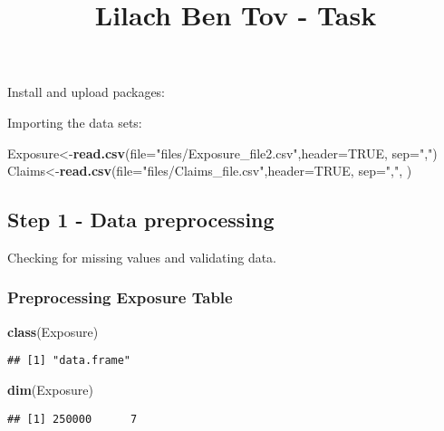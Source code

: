 \documentclass[]{article}
\title{Lilach Ben Tov - Task}
\author{}
\date{}
\newenvironment{Shaded}{\begin{snugshade}}{\end{snugshade}}
\newcommand{\KeywordTok}[1]{\textcolor[rgb]{0.13,0.29,0.53}{\textbf{#1}}}
\newcommand{\DataTypeTok}[1]{\textcolor[rgb]{0.13,0.29,0.53}{#1}}
\newcommand{\StringTok}[1]{\textcolor[rgb]{0.31,0.60,0.02}{#1}}
\newcommand{\OtherTok}[1]{\textcolor[rgb]{0.56,0.35,0.01}{#1}}
\newcommand{\NormalTok}[1]{#1}
\begin{document}
\maketitle

Install and upload packages:

Importing the data sets:

\begin{Shaded}
\begin{Highlighting}[]
\NormalTok{Exposure<-}\KeywordTok{read.csv}\NormalTok{(}\DataTypeTok{file=}\StringTok{"files/Exposure_file2.csv"}\NormalTok{,}\DataTypeTok{header=}\OtherTok{TRUE}\NormalTok{, }\DataTypeTok{sep=}\StringTok{","}\NormalTok{)}
\NormalTok{Claims<-}\KeywordTok{read.csv}\NormalTok{(}\DataTypeTok{file=}\StringTok{"files/Claims_file.csv"}\NormalTok{,}\DataTypeTok{header=}\OtherTok{TRUE}\NormalTok{, }\DataTypeTok{sep=}\StringTok{","}\NormalTok{, )}
\end{Highlighting}
\end{Shaded}

\subsection{Step 1 - Data
preprocessing}\label{step-1---data-preprocessing}

Checking for missing values and validating data.

\subsubsection{Preprocessing Exposure
Table}\label{preprocessing-exposure-table}

\begin{Shaded}
\begin{Highlighting}[]
\KeywordTok{class}\NormalTok{(Exposure)}
\end{Highlighting}
\end{Shaded}

\begin{verbatim}
## [1] "data.frame"
\end{verbatim}

\begin{Shaded}
\begin{Highlighting}[]
\KeywordTok{dim}\NormalTok{(Exposure)}
\end{Highlighting}
\end{Shaded}

\begin{verbatim}
## [1] 250000      7
\end{verbatim}
\end{document}
